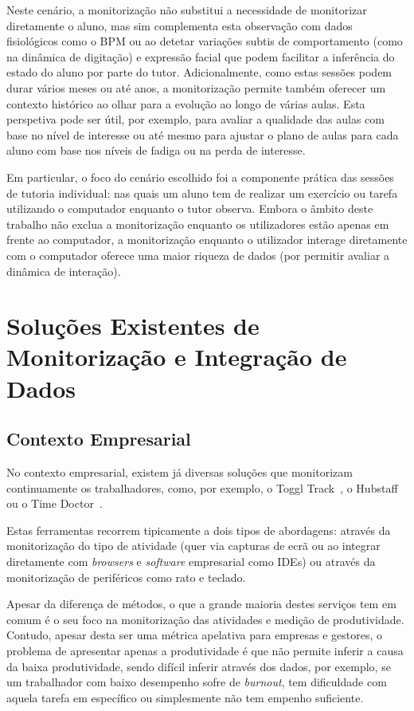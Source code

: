 Neste cenário, a monitorização não substitui a necessidade de monitorizar diretamente o aluno, mas sim complementa esta observação com dados fisiológicos como o \ac{BPM} ou ao detetar variações subtis de comportamento (como na dinâmica de digitação) e expressão facial que podem facilitar a inferência do estado do aluno por parte do tutor.
Adicionalmente, como estas sessões podem durar vários meses ou até anos, a monitorização permite também oferecer um contexto histórico ao olhar para a evolução ao longo de várias aulas.
Esta perspetiva pode ser útil, por exemplo, para avaliar a qualidade das aulas com base no nível de interesse ou até mesmo para ajustar o plano de aulas para cada aluno com base nos níveis de fadiga ou na perda de interesse.

Em particular, o foco do cenário escolhido foi a componente prática das sessões de tutoria individual: nas quais um aluno tem de realizar um exercício ou tarefa utilizando o computador enquanto o tutor observa.
Embora o âmbito deste trabalho não exclua a monitorização enquanto os utilizadores estão apenas em frente ao computador, a monitorização enquanto o utilizador interage diretamente com o computador oferece uma maior riqueza de dados (por permitir avaliar a dinâmica de interação).



\section{Soluções Existentes de Monitorização e Integração de Dados}

\subsection{Contexto Empresarial}

No contexto empresarial, existem já diversas soluções que monitorizam continuamente os trabalhadores, como, por exemplo, o Toggl Track~\cite{toggletrack}, o Hubstaff~\cite{hubstaff} ou o Time Doctor~\cite{timedoctor}.

Estas ferramentas recorrem tipicamente a dois tipos de abordagens: através da monitorização do tipo de atividade (quer via capturas de ecrã ou ao integrar diretamente com \textit{browsers} e \textit{software} empresarial como \ac{IDE}s) ou através da monitorização de periféricos como rato e teclado.

Apesar da diferença de métodos, o que a grande maioria destes serviços tem em comum é o seu foco na monitorização das atividades e medição de produtividade. Contudo, apesar desta ser uma métrica apelativa para empresas e gestores, o problema de apresentar apenas a produtividade é que não permite inferir a causa da baixa produtividade, sendo difícil inferir através dos dados, por exemplo, se um trabalhador com baixo desempenho sofre de \textit{burnout}, tem dificuldade com aquela tarefa em específico ou simplesmente não tem empenho suficiente.


